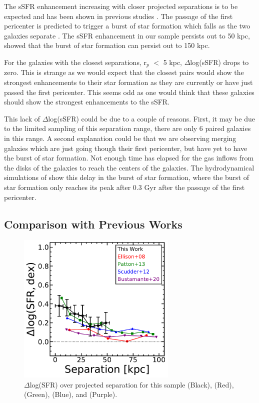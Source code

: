 \documentclass[iop,revtex4,twocolumn,apj,numberedappendix,appendixfloats]{emulateapj}
\begin{document}
The sSFR enhancement increasing with closer projected separations is to be expected and has been shown in previous studies \citep{Ellison:2008, Scudder:2012, Patton:2013}. The passage of the first pericenter is predicted to trigger a burst of star formation which falls as the two galaxies separate \citep{Scudder:2012}. The sSFR enhancement in our sample persists out to 50 kpc, \citet{Patton:2013} showed that the burst of star formation can persist out to 150 kpc. 

For the galaxies with the closest separations, r$_p$ $<$ 5 kpc, $\Delta$log(sSFR) drops to zero. This is strange as we would expect that the closest pairs would show the strongest enhancements to their star formation as they are currently or have just passed the first pericenter. This seems odd as one would think that these galaxies should show the strongest enhancements to the sSFR. 

This lack of $\Delta$log(sSFR) could be due to a couple of reasons. First, it may be due to the limited sampling of this separation range, there are only 6 paired galaxies in this range. A second explanation could be that we are observing merging galaxies which are just going though their first pericenter, but have yet to have the burst of star formation. Not enough time has elapsed for the gas inflows from the disks of the galaxies to reach the centers of the galaxies. The hydrodynamical simulations of \citet{Scudder:2012} show this delay in the burst of star formation, where the burst of star formation only reaches its peak after 0.3 Gyr after the passage of the first pericenter. 

\subsection{Comparison with Previous Works}

\begin{figure}
\centering
\includegraphics[width=3in]{fig/nuc_sep.pdf}
\caption[]{$\Delta$log(SFR) over projected separation for this sample (Black), \citet{Ellison:2008} (Red), \citet{Patton:2013} (Green), \citet{Scudder:2012} (Blue), and \citet{Bustamante:2020} (Purple). }
\label{fig:nuc_sep}
\end{figure}
\end{document}
